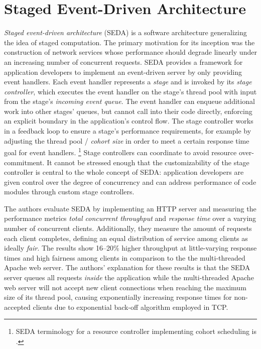\documentclass[12pt,a4paper]{book}
\begin{document}
\section{Staged Event-Driven Architecture}\label{ch:relwork:seda}
\emph{Staged event-driven architecture} (SEDA) is a software architecture generalizing the idea of staged computation.
The primary motivation for its inception was the construction of network services whose performance should degrade linearly under an increasing number of concurrent requests.
SEDA provides a framework for application developers to implement an event-driven server by only providing event handlers.
Each event handler represents a \emph{stage} and is invoked by its \emph{stage controller}, which executes the event handler on the stage's thread pool with input from the stage's \emph{incoming event queue}.
The event handler can enqueue additional work into other stages' queues, but cannot call into their code directly, enforcing an explicit boundary in the application's control flow.
The stage controller works in a feedback loop to ensure a stage's performance requirements, for example by adjusting the thread pool / \emph{cohort size} in order to meet a certain response time goal for event handlers.%
\footnote{SEDA terminology for a resource controller implementing cohort scheduling is .}
Stage controllers can coordinate to avoid resource over-commitment.
It cannot be stressed enough that the customizability of the stage controller is central to the whole concept of SEDA:
application developers are given control over the degree of concurrency and can address performance of code modules through custom stage controllers.~\cite{seda}

The authors evaluate SEDA by implementing an HTTP server and measuring the performance metrics \emph{total concurrent throughput} and \emph{response time} over a varying number of concurrent clients.
Additionally, they measure the amount of requests each client completes, defining an equal distribution of service among clients as ideally \emph{fair}. %
The results show 16--20\% higher throughput at little-varying response times and high fairness among clients in comparison to the the multi-threaded Apache web server. %
The authors' explanation for these results is that the SEDA server queues all requests \emph{inside} the application while the multi-threaded Apache web server will not accept new client connections when reaching the maximum size of its thread pool, causing exponentially increasing response times for non-accepted clients due to exponential back-off algorithm employed in TCP.~\cite{seda}
\end{document}
